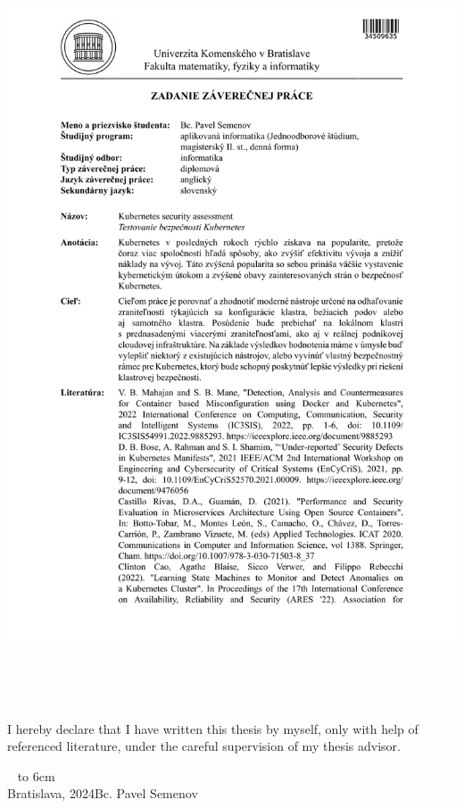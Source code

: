 \documentclass[12pt, oneside, openany]{book}
\def\mfauthor{Bc. Pavel Semenov}
\def\mfplacedate{Bratislava, 2024}
\begin{document}
\newpage 
\thispagestyle{empty}
\hspace{-2cm}\includegraphics[page=2,width=1.1\textwidth]{assignment_sk.PDF}




{~}\vspace{12cm}

\noindent
\begin{minipage}{0.25\textwidth}~\end{minipage}
\thispagestyle{empty}
\begin{minipage}{0.75\textwidth}
I hereby declare that I have written this thesis by myself, only with help of referenced literature, under the careful supervision of my thesis advisor.
\newline \newline
\end{minipage}
\vfill
~ \hfill {\hbox to 6cm{\dotfill}} \\
\mfplacedate \hfill \mfauthor
\vfill\eject \cleardoublepage
\end{document}
